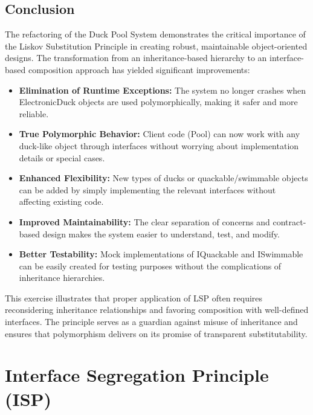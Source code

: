 \subsection{Conclusion}

The refactoring of the Duck Pool System demonstrates the critical importance of the Liskov Substitution Principle in creating robust, maintainable object-oriented designs. The transformation from an inheritance-based hierarchy to an interface-based composition approach has yielded significant improvements:

\begin{itemize}
    \item \textbf{Elimination of Runtime Exceptions:} The system no longer crashes when ElectronicDuck objects are used polymorphically, making it safer and more reliable.
    
    \item \textbf{True Polymorphic Behavior:} Client code (Pool) can now work with any duck-like object through interfaces without worrying about implementation details or special cases.
    
    \item \textbf{Enhanced Flexibility:} New types of ducks or quackable/swimmable objects can be added by simply implementing the relevant interfaces without affecting existing code.
    
    \item \textbf{Improved Maintainability:} The clear separation of concerns and contract-based design makes the system easier to understand, test, and modify.
    
    \item \textbf{Better Testability:} Mock implementations of IQuackable and ISwimmable can be easily created for testing purposes without the complications of inheritance hierarchies.
\end{itemize}

This exercise illustrates that proper application of LSP often requires reconsidering inheritance relationships and favoring composition with well-defined interfaces. The principle serves as a guardian against misuse of inheritance and ensures that polymorphism delivers on its promise of transparent substitutability.


\section{Interface Segregation Principle (ISP)}

